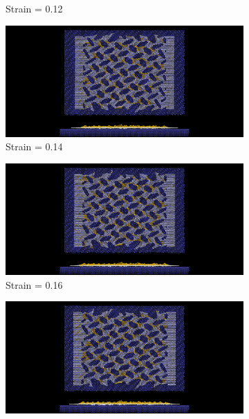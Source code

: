 \begin{figure}[H]
\begin{subfigure}[b]{0.49\textwidth}
        \caption{Strain = 0.12}
    \end{subfigure}
    \hfill
    \begin{subfigure}[b]{0.49\textwidth}
        \centering
        \includegraphics[width=\textwidth]{figures/baseline/contact_vs_stretch/popup/pop_stretch0014.png}
        \caption{Strain = 0.14}
    \end{subfigure}
    \begin{subfigure}[b]{0.49\textwidth}
        \centering
        \includegraphics[width=\textwidth]{figures/baseline/contact_vs_stretch/popup/pop_stretch0016.png}
        \caption{Strain = 0.16}
    \end{subfigure}
    \hfill
    \begin{subfigure}[b]{0.49\textwidth}
        \centering
        \includegraphics[width=\textwidth]{figures/baseline/contact_vs_stretch/popup/pop_stretch0018.png}

\end{subfigure}
\end{figure}
